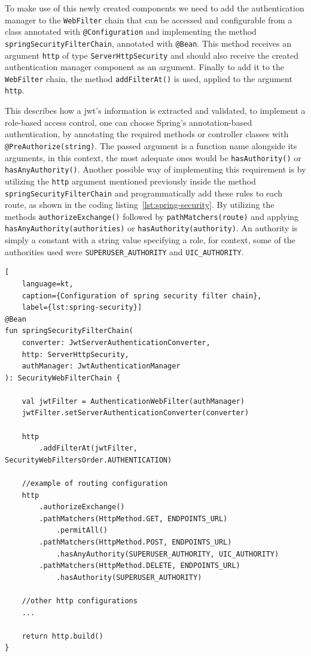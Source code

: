 To make use of this newly created components we need to add the authentication manager to the \texttt{WebFilter} chain that can be accessed and configurable from a class annotated with \texttt{@Configuration} and implementing the method \texttt{springSecurityFilterChain}, annotated with \texttt{@Bean}. 
This method receives an argument \texttt{http} of type \texttt{ServerHttpSecurity} and should also receive the created authentication manager component as an argument. 
Finally to add it to the \texttt{WebFilter} chain, the method \texttt{addFilterAt()} is used, applied to the argument \texttt{http}. 

This describes how a \acrshort{jwt}'s information is extracted and validated, to implement a role-based access control, one can choose Spring's annotation-based authentication, by annotating the required methods or controller classes with \texttt{@PreAuthorize(string)}. The passed argument is a function name alongside its arguments, in this context, the most adequate ones would be \texttt{hasAuthority()} or \texttt{hasAnyAuthority()}. Another possible way of implementing this requirement is by utilizing the \texttt{http} argument mentioned previously inside the method \texttt{springSecurityFilterChain} and programmatically add these rules to each route, as shown in the coding listing~\ref{lst:spring-security}. By utilizing the methods \texttt{authorizeExchange()} followed by \texttt{pathMatchers(route)} and applying \texttt{hasAnyAuthority(authorities)} or \texttt{hasAuthority(authority)}. An authority is simply a constant with a string value specifying a role, for context, some of the authorities used were \texttt{SUPERUSER\_AUTHORITY} and \texttt{UIC\_AUTHORITY}. 


\begin{lstlisting}[
    language=kt, 
    caption={Configuration of spring security filter chain},
    label={lst:spring-security}]
@Bean
fun springSecurityFilterChain(
    converter: JwtServerAuthenticationConverter,
    http: ServerHttpSecurity,
    authManager: JwtAuthenticationManager
): SecurityWebFilterChain {

    val jwtFilter = AuthenticationWebFilter(authManager)
    jwtFilter.setServerAuthenticationConverter(converter)

    http
        .addFilterAt(jwtFilter, SecurityWebFiltersOrder.AUTHENTICATION)

    //example of routing configuration
    http
        .authorizeExchange()
        .pathMatchers(HttpMethod.GET, ENDPOINTS_URL)
            .permitAll()
        .pathMatchers(HttpMethod.POST, ENDPOINTS_URL)
            .hasAnyAuthority(SUPERUSER_AUTHORITY, UIC_AUTHORITY)
        .pathMatchers(HttpMethod.DELETE, ENDPOINTS_URL)
            .hasAuthority(SUPERUSER_AUTHORITY)
             
    //other http configurations
    ...
            
    return http.build()
}
\end{lstlisting}

